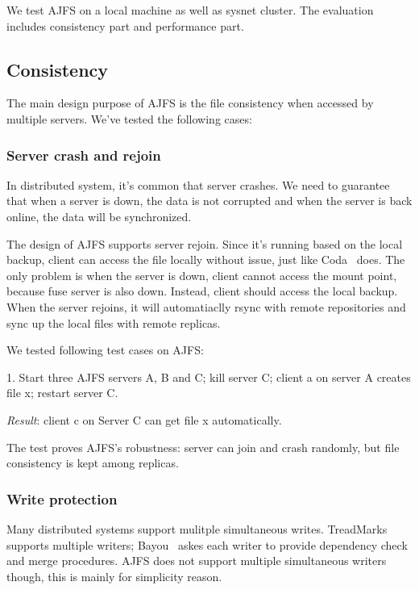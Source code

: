 We test AJFS on a local machine as well as sysnet cluster. The evaluation includes consistency part and performance part.

\subsection{Consistency}

The main design purpose of AJFS is the file consistency when accessed by multiple servers. We've tested the following cases:

\subsubsection{Server crash and rejoin}

In distributed system, it's common that server crashes. We need to guarantee that when a server is down, the data is not corrupted and when the server is back online, the data will be synchronized.

The design of AJFS supports server rejoin. Since it's running based on the local backup, client can access the file locally without issue, just like Coda~\cite{KS92} does.
The only problem is when the server is down, client cannot access the mount point, because fuse server is also down. Instead, client should access the local backup. When the server rejoins, it will automatiaclly rsync with remote repositories and sync up the local files with remote replicas.

We tested following test cases on AJFS:

1. Start three AJFS servers A, B and C; kill server C; client a on server A creates file x; restart server C.

\emph{Result}: client c on Server C can get file x automatically.

The test proves AJFS's robustness: server can join and crash randomly, but file consistency is kept among replicas.

\subsubsection{Write protection}

Many distributed systems support mulitple simultaneous writes. TreadMarks~\cite{treadmarks} supports multiple writers; Bayou~\cite{bayou} askes each writer to provide dependency check and merge procedures.
AJFS does not support multiple simultaneous writers though, this is mainly for simplicity reason. 

